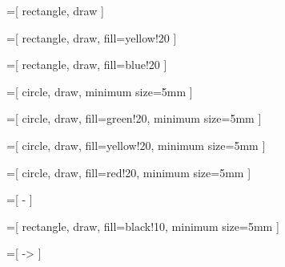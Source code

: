 
=[
	rectangle,
	draw
]

=[
	rectangle,
	draw,
	fill=yellow!20
]

=[
	rectangle,
	draw,
	fill=blue!20
]

=[
	circle,
	draw,
	minimum size=5mm
]

=[
	circle,
	draw,
	fill=green!20,
	minimum size=5mm
]

=[
	circle,
	draw,
	fill=yellow!20,
	minimum size=5mm
]

=[
	circle,
	draw,
	fill=red!20,
	minimum size=5mm
]

=[
	-
]

=[
	rectangle,
	draw,
	fill=black!10,
	minimum size=5mm
]

=[
	->
]

\newcommand{\atomlegend}[2]{
	\node [rectangle,draw,fill=blue!20,minimum width=0.8cm] (body) at(#1,#2) {};
	\node [] (bodyLabel)							at(#1+1.4,#2)			{corps};
	\node [rectangle,draw,fill=yellow!20,minimum width=0.8cm] (head) at(#1,#2-0.5) {};
	\node [] (headLabel)							at(#1+1.4,#2-0.5)				{tête};
	\node [rectangle,draw,fill=green!20,minimum width=0.8cm] (fr) at(#1,#2-1) {};
	\node [] (frLabel)							at(#1+1.4,#2-1)				{frontière};
	\node [rectangle,draw,fill=red!20,minimum width=0.8cm] (cst) at(#1,#2-1.5) {};
	\node [] (cstLabel)							at(#1+1.4,#2-1.5)				{constantes};
}


